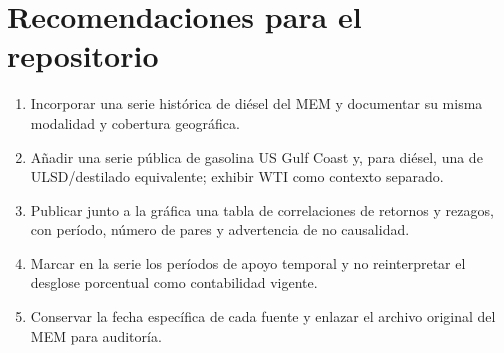 \documentclass[11pt,letterpaper]{article}
\begin{document}
\section{Recomendaciones para el repositorio}
\begin{enumerate}
  \item Incorporar una serie histórica de diésel del MEM y documentar su misma modalidad y cobertura geográfica.
  \item Añadir una serie pública de gasolina US Gulf Coast y, para diésel, una de ULSD/destilado equivalente; exhibir WTI como contexto separado.
  \item Publicar junto a la gráfica una tabla de correlaciones de retornos y rezagos, con período, número de pares y advertencia de no causalidad.
  \item Marcar en la serie los períodos de apoyo temporal y no reinterpretar el desglose porcentual como contabilidad vigente.
  \item Conservar la fecha específica de cada fuente y enlazar el archivo original del MEM para auditoría.
\end{enumerate}

\printbibliography[title={Referencias bibliográficas}]
\end{document}
